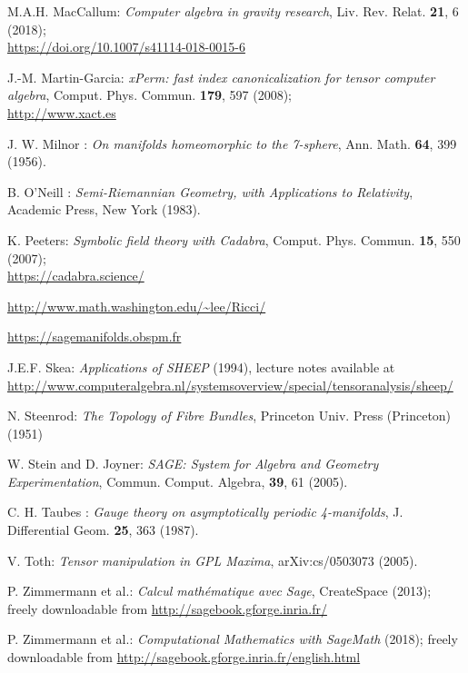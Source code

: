 \begin{thebibliography}{123}
M.A.H. MacCallum: {\em Computer algebra in gravity research},
Liv. Rev. Relat. {\bf 21}, 6 (2018);\\
\url{https://doi.org/10.1007/s41114-018-0015-6}

J.-M. Martin-Garcia: {\em xPerm: fast index canonicalization for tensor computer algebra}, Comput. Phys. Commun. {\bf 179}, 597 (2008);\\
\url{http://www.xact.es}

J. W. Milnor : {\em On manifolds homeomorphic to the 7-sphere},
Ann. Math. {\bf 64}, 399 (1956).

B. O'Neill : {\em Semi-Riemannian Geometry, with Applications to Relativity},
Academic Press, New York (1983).

K. Peeters: {\em Symbolic field theory with Cadabra},
Comput. Phys. Commun. {\bf 15}, 550 (2007);\\
\url{https://cadabra.science/}

\url{http://www.math.washington.edu/~lee/Ricci/}

\url{https://sagemanifolds.obspm.fr}

J.E.F. Skea: \emph{Applications of SHEEP} (1994), lecture notes available at
\url{http://www.computeralgebra.nl/systemsoverview/special/tensoranalysis/sheep/}

N. Steenrod: \emph{The Topology of Fibre Bundles}, Princeton Univ. Press (Princeton) (1951)

W. Stein and D. Joyner: {\em SAGE: System for Algebra and Geometry Experimentation},
Commun. Comput. Algebra, {\bf 39}, 61 (2005).

C. H. Taubes : {\em Gauge theory on asymptotically periodic 4-manifolds},
J. Differential Geom. {\bf 25}, 363 (1987).

V. Toth: {\em Tensor manipulation in GPL Maxima},
arXiv:cs/0503073 (2005).

P. Zimmermann et al.: {\it Calcul math\'ematique avec Sage}, CreateSpace (2013);
freely downloadable from \url{http://sagebook.gforge.inria.fr/}

P. Zimmermann et al.: {\it Computational Mathematics with SageMath} (2018);
freely downloadable from \url{http://sagebook.gforge.inria.fr/english.html}

\end{thebibliography}
